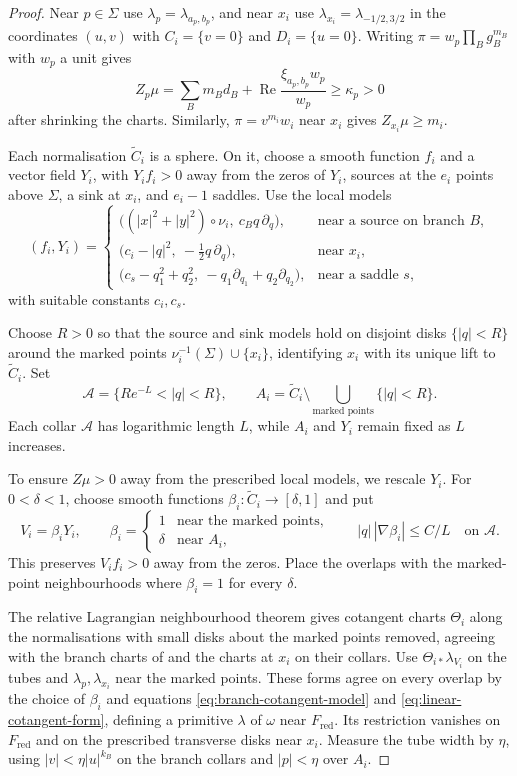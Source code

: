 \documentclass[a4paper]{amsart}
\DeclareMathOperator{\Ree}{Re}
\numberwithin{equation}{section}
\begin{document}
\begin{proof}
Near $p\in\Sigma$ use $\lambda_p=\lambda_{a_p,b_p}$, and near
$x_i$ use $\lambda_{x_i}=\lambda_{-1/2,3/2}$ in the coordinates
$(u,v)$ with $C_i=\{v=0\}$ and $D_i=\{u=0\}$. Writing
$\pi=w_p\prod_Bg_B^{m_B}$ with $w_p$ a unit gives
\[
 Z_p\mu=\sum_Bm_Bd_B+\Ree\frac{\xi_{a_p,b_p}w_p}{w_p}
 \ge\kappa_p>0
\]
after shrinking the charts. Similarly, $\pi=v^{m_i}w_i$ near $x_i$
gives $Z_{x_i}\mu\ge m_i$.

Each normalisation $\widetilde C_i$ is a sphere. On it, choose a
smooth function $f_i$ and a vector field $Y_i$, with $Y_if_i>0$
away from the zeros of $Y_i$, sources at the $e_i$ points above
$\Sigma$, a sink at $x_i$, and $e_i-1$ saddles. Use the local models
\[
 (f_i,Y_i)=
 \begin{cases}
 \bigl((|x|^2+|y|^2)\circ\nu_i,\ c_Bq\,\partial_q\bigr),
     &\text{near a source on branch }B,\\
 \bigl(c_i-|q|^2,\ -\tfrac12q\,\partial_q\bigr),
     &\text{near }x_i,\\
 \bigl(c_s-q_1^2+q_2^2,\ -q_1\partial_{q_1}+q_2\partial_{q_2}\bigr),
     &\text{near a saddle }s,
 \end{cases}
\]
with suitable constants $c_i,c_s$.

Choose $R>0$ so that the source and sink models hold on disjoint
disks $\{|q|<R\}$ around the marked points
$\nu_i^{-1}(\Sigma)\cup\{x_i\}$, identifying $x_i$ with its unique
lift to $\widetilde C_i$. Set
\[
 \mathcal A=\{Re^{-L}<|q|<R\},\qquad
 A_i=\widetilde C_i\setminus
 \bigcup_{\text{marked points}}\{|q|<R\}.
\]
Each collar $\mathcal A$ has logarithmic length $L$, while $A_i$
and $Y_i$ remain fixed as $L$ increases.

To ensure $Z\mu>0$ away from the prescribed local models, we
rescale $Y_i$. For $0<\delta<1$, choose smooth functions
$\beta_i:\widetilde C_i\to[\delta,1]$ and put
\[
 V_i=\beta_iY_i,\qquad
 \beta_i=
 \begin{cases}
 1&\text{near the marked points},\\
 \delta&\text{near }A_i,
 \end{cases}
 \qquad |q|\,|\nabla\beta_i|\le C/L\quad\text{on }\mathcal A.
\]
This preserves $V_if_i>0$ away from the zeros. Place the overlaps
with the marked-point neighbourhoods where $\beta_i=1$ for every $\delta$.

The relative Lagrangian neighbourhood theorem gives cotangent charts
$\Theta_i$
along the normalisations with small disks about the marked points
removed, agreeing with the branch charts
of  and the charts at $x_i$ on their
collars. Use $\Theta_{i*}\lambda_{V_i}$ on the tubes and
$\lambda_p,\lambda_{x_i}$ near the marked points. These forms agree
on every overlap by the choice of $\beta_i$ and equations
\eqref{eq:branch-cotangent-model} and \eqref{eq:linear-cotangent-form},
defining a primitive $\lambda$ of $\omega$ near $F_{\mathrm{red}}$. Its restriction
vanishes on $F_{\mathrm{red}}$ and on the prescribed
transverse disks near $x_i$. Measure the tube width by $\eta$, using
$|v|<\eta|u|^{k_B}$ on the branch collars and $|p|<\eta$ over $A_i$.


\end{proof}
\end{document}

